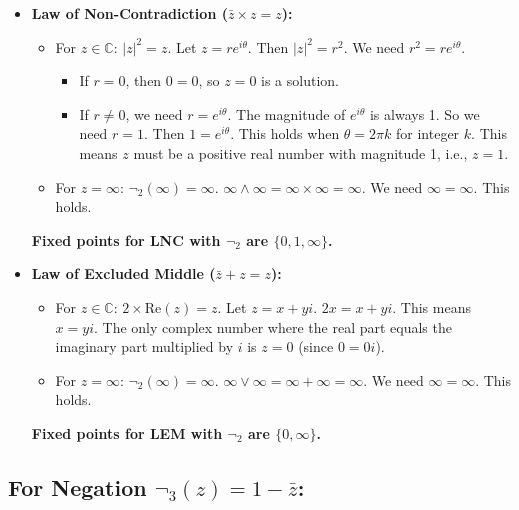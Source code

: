 	\begin{itemize}
		\item \textbf{Law of Non-Contradiction ($\bar{z} \times z = z$):}
		\begin{itemize}
			\item For $z \in \mathbb{C}$: $|z|^2 = z$. Let $z = re^{i\theta}$. Then $|z|^2 = r^2$. We need $r^2 = re^{i\theta}$.
			\begin{itemize}
				\item If $r = 0$, then $0 = 0$, so $z = 0$ is a solution.
				\item If $r \neq 0$, we need $r = e^{i\theta}$. The magnitude of $e^{i\theta}$ is always 1. So we need $r = 1$. Then $1 = e^{i\theta}$. This holds when $\theta = 2\pi k$ for integer $k$. This means $z$ must be a positive real number with magnitude 1, i.e., $z = 1$.
			\end{itemize}
			\item For $z = \infty$: $\neg_2(\infty) = \infty$. $\infty \wedge \infty = \infty \times \infty = \infty$. We need $\infty = \infty$. This holds.
		\end{itemize}
		\textbf{Fixed points for LNC with $\neg_2$ are $\{0, 1, \infty\}$.}
		
		\item \textbf{Law of Excluded Middle ($\bar{z} + z = z$):}
		\begin{itemize}
			\item For $z \in \mathbb{C}$: $2 \times \text{Re}(z) = z$. Let $z = x + yi$. $2x = x + yi$. This means $x = yi$. The only complex number where the real part equals the imaginary part multiplied by $i$ is $z = 0$ (since $0 = 0i$).
			\item For $z = \infty$: $\neg_2(\infty) = \infty$. $\infty \vee \infty = \infty + \infty = \infty$. We need $\infty = \infty$. This holds.
		\end{itemize}
		\textbf{Fixed points for LEM with $\neg_2$ are $\{0, \infty\}$.}
	\end{itemize}
	
	\subsection{For Negation $\neg_3(z) = 1 - \bar{z}$:}
	
